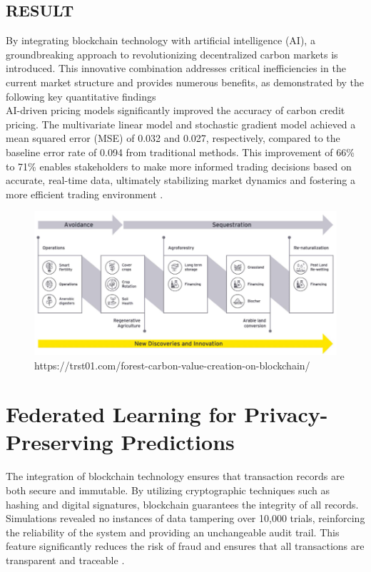 \documentclass[preprint,12pt]{elsarticle}
\begin{document}
\subsection{RESULT}
By integrating blockchain technology with artificial intelligence (AI), a groundbreaking approach to revolutionizing decentralized carbon markets is introduced. This innovative combination addresses critical inefficiencies in the current market structure and provides numerous benefits, as demonstrated by the following key quantitative findings\\
AI-driven pricing models significantly improved the accuracy of carbon credit pricing. The multivariate linear model and stochastic gradient model achieved a mean squared error (MSE) of 0.032 and 0.027, respectively, compared to the baseline error rate of 0.094 from traditional methods. This improvement of 66\% to 71\% enables stakeholders to make more informed trading decisions based on accurate, real-time data, ultimately stabilizing market dynamics and fostering a more efficient trading environment .
\begin{figure}[ht!]
    \centering
    \includegraphics[width=0.9\linewidth]{fig/fig1b.png}
    \caption{https://trst01.com/forest-carbon-value-creation-on-blockchain/\citep{Baklaga2023synergizing}}
\end{figure}
\section{Federated Learning for Privacy-Preserving Predictions}
The integration of blockchain technology ensures that transaction records are both secure and immutable. By utilizing cryptographic techniques such as hashing and digital signatures, blockchain guarantees the integrity of all records. Simulations revealed no instances of data tampering over 10,000 trials, reinforcing the reliability of the system and providing an unchangeable audit trail. This feature significantly reduces the risk of fraud and ensures that all transactions are transparent and traceable \citep{doe2023enhancing}.
\end{document}
